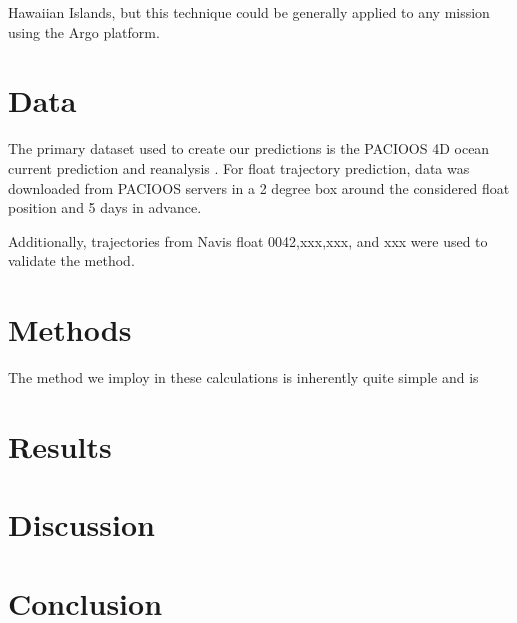 \documentclass{ametsocV5}
\begin{document}
Hawaiian Islands, but this technique could be generally applied to any mission using the Argo platform. %

\section{Data}
The primary dataset used to create our predictions is the PACIOOS 4D ocean current prediction \citep{PacIOOS} and reanalysis \cite{partridge2019reanalysis}.
For float trajectory prediction, data was downloaded from PACIOOS servers in a 2 degree box around the considered float position and 5 days in advance. 

Additionally, trajectories from Navis float 0042,xxx,xxx, and xxx %
were used to validate the method. 


\section{Methods}
The method we imploy in these calculations is inherently quite simple and is 

\section{Results}

\section{Discussion}

\section{Conclusion}

%
%
%


%
\end{document}
